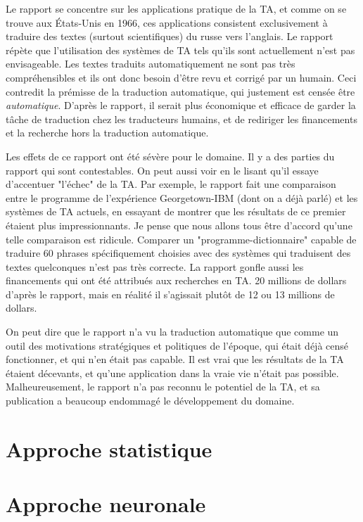 \documentclass[11pt, a4paper]{report}
\begin{document}
  Le rapport se concentre sur les applications pratique de la TA, et comme on se trouve aux 
  États-Unis en 1966, ces applications consistent exclusivement à traduire des textes 
  (surtout scientifiques) du russe vers l'anglais. Le rapport répète que l'utilisation des 
  systèmes de TA tels qu'ils sont actuellement n'est pas envisageable. Les textes traduits 
  automatiquement ne sont pas très compréhensibles et ils ont donc besoin d'être revu et 
  corrigé par un humain. Ceci contredit la prémisse de la traduction automatique, qui justement est
  censée être \textit{automatique}. D'après le rapport, il serait plus économique et efficace 
  de garder la tâche de traduction chez les traducteurs humains, et de rediriger les financements 
  et la recherche hors la traduction automatique. 

  Les effets de ce rapport ont été sévère pour le domaine. Il y a des parties du rapport qui sont 
  contestables. On peut aussi voir en le lisant qu'il essaye d'accentuer "l'échec" de la TA. 
  Par exemple, le rapport fait une comparaison entre le programme de l'expérience Georgetown-IBM 
  (dont on a déjà parlé) et les systèmes de TA actuels, en essayant de montrer que les résultats 
  de ce premier étaient plus impressionnants. Je pense que nous allons tous être 
  d'accord qu'une telle comparaison est ridicule. Comparer un "programme-dictionnaire" capable 
  de traduire 60 phrases spécifiquement choisies avec des systèmes qui traduisent des textes 
  quelconques n'est pas très correcte. La rapport gonfle aussi les financements qui ont 
  été attribués aux recherches en TA. 20 millions de dollars d'après le rapport, mais en réalité 
  il s'agissait plutôt de 12 ou 13 millions de dollars. 
  
  On peut dire que le rapport n'a vu la traduction automatique que comme un outil des 
  motivations stratégiques et politiques de l'époque, qui était 
  déjà censé fonctionner, et qui n'en était pas capable. Il est vrai que les résultats 
  de la TA étaient décevants, et qu'une application dans la vraie vie n'était pas possible. 
  Malheureusement, le rapport n'a pas reconnu le potentiel de la TA, et sa publication 
  a beaucoup endommagé le développement du domaine.   

  \section{Approche statistique}
  \section{Approche neuronale}
\end{document}

